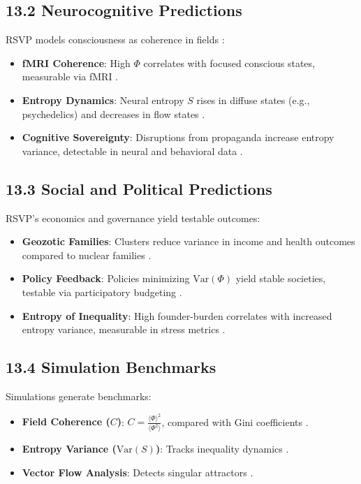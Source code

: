 \documentclass[12pt]{article}
\begin{document}
\subsection*{13.2 Neurocognitive Predictions}
RSVP models consciousness as coherence in fields \citep{tononi2004}:
\begin{itemize}
    \item \textbf{fMRI Coherence}: High \(\Phi\) correlates with focused conscious states, measurable via fMRI \citep{hohwy2013}.
    \item \textbf{Entropy Dynamics}: Neural entropy \(S\) rises in diffuse states (e.g., psychedelics) and decreases in flow states \citep{shannon1948}.
    \item \textbf{Cognitive Sovereignty}: Disruptions from propaganda increase entropy variance, detectable in neural and behavioral data \citep{lanier2018}.
\end{itemize}
\subsection*{13.3 Social and Political Predictions}
RSVP's economics and governance yield testable outcomes:
\begin{itemize}
    \item \textbf{Geozotic Families}: Clusters reduce variance in income and health outcomes compared to nuclear families \citep{deleuze1987}.
    \item \textbf{Policy Feedback}: Policies minimizing \(\mathrm{Var}(\Phi)\) yield stable societies, testable via participatory budgeting \citep{hanson2003}.
    \item \textbf{Entropy of Inequality}: High founder-burden correlates with increased entropy variance, measurable in stress metrics \citep{zuboff2019}.
\end{itemize}
\subsection*{13.4 Simulation Benchmarks}
Simulations generate benchmarks:
\begin{itemize}
    \item \textbf{Field Coherence (\(C\))}: \(C = \frac{\langle \Phi \rangle^2}{\langle \Phi^2 \rangle}\), compared with Gini coefficients \citep{gromov1999}.
    \item \textbf{Entropy Variance (\(\mathrm{Var}(S)\))}: Tracks inequality dynamics \citep{shannon1948}.
    \item \textbf{Vector Flow Analysis}: Detects singular attractors \citep{pearl2009}.
\end{itemize}
\end{document}
